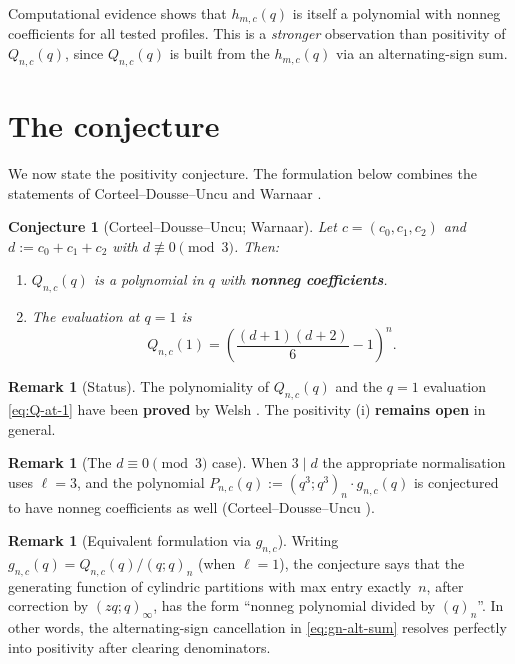 \documentclass[11pt]{article}
\theoremstyle{plain}
\newtheorem{conjecture}[theorem]{Conjecture}
\theoremstyle{definition}
\newtheorem{remark}[theorem]{Remark}
\newcommand{\qpoch}[2]{(#1;#2)_\infty}
\newcommand{\qpochn}[3]{(#1;#2)_{#3}}
\begin{document}
Computational evidence shows that $h_{m,c}(q)$ is itself a polynomial with
nonneg coefficients for all tested profiles.  This is a \emph{stronger}
observation than positivity of $Q_{n,c}(q)$, since $Q_{n,c}(q)$ is built
from the $h_{m,c}(q)$ via an alternating-sign sum.


\section{The conjecture}
\label{sec:conjecture}

We now state the positivity conjecture.  The formulation below combines
the statements of Corteel--Dousse--Uncu \cite[Conjecture~4.2]{CDU}
and Warnaar \cite[Conjecture~2.7]{W}.

\begin{conjecture}[Corteel--Dousse--Uncu; Warnaar]
\label{conj:main}
Let $c = (c_0, c_1, c_2)$ and $d := c_0 + c_1 + c_2$ with
$d \not\equiv 0 \pmod{3}$.  Then:
\begin{enumerate}
  \item[(i)] $Q_{n,c}(q)$ is a polynomial in $q$ with
    \textbf{nonneg coefficients}.
  \item[(ii)] The evaluation at $q = 1$ is
    \begin{equation}
      Q_{n,c}(1)
      = \left(\frac{(d+1)(d+2)}{6} - 1\right)^{\!n}.
      \label{eq:Q-at-1}
    \end{equation}
\end{enumerate}
\end{conjecture}

\begin{remark}[Status]
The polynomiality of $Q_{n,c}(q)$ and the $q = 1$ evaluation \eqref{eq:Q-at-1}
have been \textbf{proved} by Welsh \cite{Welsh}.
The positivity (i) \textbf{remains open} in general.
\end{remark}

\begin{remark}[The $d \equiv 0 \pmod{3}$ case]
When $3 \mid d$ the appropriate normalisation uses $\ell = 3$, and the
polynomial $P_{n,c}(q) := \qpochn{q^3}{q^3}{n} \cdot g_{n,c}(q)$ is
conjectured to have nonneg coefficients as well
(Corteel--Dousse--Uncu \cite[Conjecture~4.2]{CDU}).
\end{remark}

\begin{remark}[Equivalent formulation via $g_{n,c}$]
Writing $g_{n,c}(q) = Q_{n,c}(q)/\qpochn{q}{q}{n}$ (when $\ell = 1$),
the conjecture says that the generating function of cylindric partitions
with max entry exactly~$n$, after correction by $\qpoch{zq}{q}$, has the
form ``nonneg polynomial divided by $(q)_n$''.  In other words, the
alternating-sign cancellation in \eqref{eq:gn-alt-sum} resolves perfectly
into positivity after clearing denominators.
\end{remark}
\end{document}
